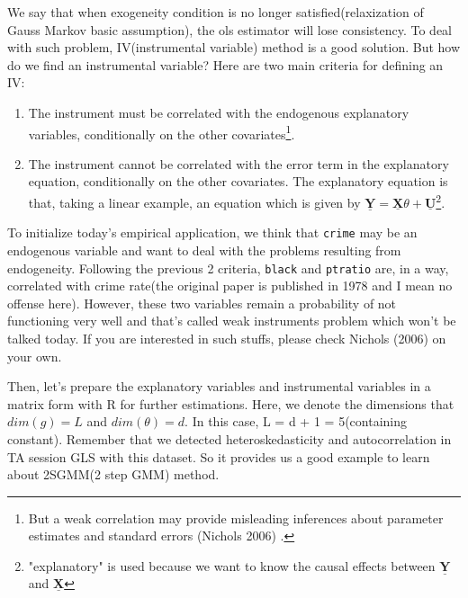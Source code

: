 \documentclass[
  12pt,
]{article}
\providecommand{\tightlist}{%
  \setlength{\itemsep}{0pt}\setlength{\parskip}{0pt}}
\begin{document}
We say that when exogeneity condition is no longer satisfied(relaxization of Gauss Markov basic assumption), the ols estimator will lose consistency. To deal with such problem, IV(instrumental variable) method is a good solution. But how do we find an instrumental variable? Here are two main criteria for defining an IV:

\begin{enumerate}
\def\labelenumi{\arabic{enumi}.}
\tightlist
\item
  The instrument must be correlated with the endogenous explanatory variables, conditionally on the other covariates\footnote{But a weak correlation may provide misleading inferences about parameter estimates and standard errors (Nichols 2006) .}.
\item
  The instrument cannot be correlated with the error term in the explanatory equation, conditionally on the other covariates. The explanatory equation is that, taking a linear example, an equation which is given by \(\mathbf{\underline{Y}} = \mathbf{\underline{X}}\theta + \mathbf{\underline{U}}\)\footnote{"explanatory" is used because we want to know the causal effects between $\mathbf{\underline{Y}}$ and $\mathbf{\underline{X}}$}.
\end{enumerate}

To initialize today's empirical application, we think that \texttt{crime} may be an endogenous variable and want to deal with the problems resulting from endogeneity. Following the previous 2 criteria, \texttt{black} and \texttt{ptratio} are, in a way, correlated with crime rate(the original paper is published in 1978 and I mean no offense here). However, these two variables remain a probability of not functioning very well and that's called weak instruments problem which won't be talked today. If you are interested in such stuffs, please check Nichols (2006) on your own.

Then, let's prepare the explanatory variables and instrumental variables in a matrix form with R for further estimations. Here, we denote the dimensions that \(dim(g) = L\) and \(dim(\theta) = d\). In this case, L = d + 1 = 5(containing constant). Remember that we detected heteroskedasticity and autocorrelation in TA session GLS with this dataset. So it provides us a good example to learn about 2SGMM(2 step GMM) method.
\end{document}
